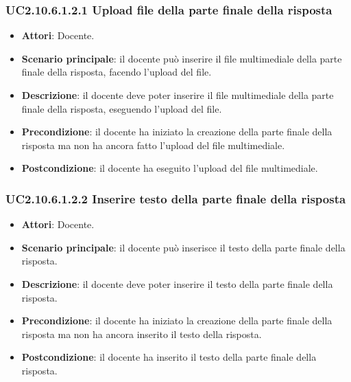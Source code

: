 \subsubsection{UC2.10.6.1.2.1 Upload file della parte finale della risposta}
\begin{itemize}
\item \textbf{Attori}: Docente.
\item \textbf{Scenario principale}: il docente può inserire il file multimediale della parte finale della risposta, facendo l'upload del file.
\item \textbf{Descrizione}: il docente deve poter inserire il file multimediale della parte finale della risposta, eseguendo l'upload del file.
\item \textbf{Precondizione}: il docente ha iniziato la creazione della parte finale della risposta ma non ha ancora fatto l'upload del file multimediale.
\item \textbf{Postcondizione}: il docente ha eseguito l'upload del file multimediale.
\end{itemize}
\subsubsection{UC2.10.6.1.2.2 Inserire testo della parte finale della risposta}
\begin{itemize}
\item \textbf{Attori}: Docente.
\item \textbf{Scenario principale}: il docente può inserisce il testo della parte finale della risposta.
\item \textbf{Descrizione}: il docente deve poter inserire il testo della parte finale della risposta.
\item \textbf{Precondizione}: il docente ha iniziato la creazione della parte finale della risposta ma non ha ancora inserito il testo della risposta.
\item \textbf{Postcondizione}: il docente ha inserito il testo della parte finale della risposta.
\end{itemize}
